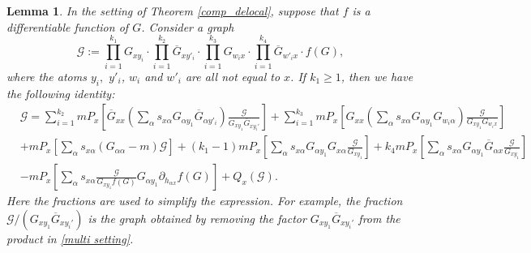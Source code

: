 \documentclass{article}
\newcommand{\1}{\mathds{1}}
\numberwithin{equation}{section}
\newcommand{\al}{\alpha}
\newcommand{\be}{\begin{equation}}
\newcommand{\ee}{\end{equation}}
\renewcommand{\cal}{\mathcal}
\renewcommand{\geq}{\geqslant}
\renewcommand{\ge}{\geq}
\theoremstyle{plain} %
\newtheorem{lemma}[theorem]{Lemma}
\theoremstyle{remark}
\newcommand{\cor}{\color{red}}
\begin{document}
\begin{lemma}%
\label{Oe14}
In the setting of Theorem \ref{comp_delocal}, suppose that $f$ is a differentiable function of $G$. Consider a graph
\be\label{multi setting}
\cal G := \prod_{i=1}^{k_1}G_{x y_i}  \cdot  \prod_{i=1}^{k_2}\overline G_{x y'_i} \cdot \prod_{i=1}^{k_3} G_{ w_i x} \cdot \prod_{i=1}^{k_4}\overline G_{ w'_i x} \cdot f(G),
\ee
where the atoms $y_i,$ $y'_i$, $w_i$ and $w'_i$ are all not equal to $x$. If $k_1\ge 1$, then we have the following identity: 
\begin{align} 
& \cal G  = \sum_{i=1}^{k_2}m P_x \left[ \overline G_{xx}  \left( \sum_\al s_{x\al }G_{\al y_1} \overline G_{\al y'_i}\right)\frac{\cal G}{G_{x y_1} \overline G_{xy_i'}} \right] + \sum_{i=1}^{k_3} m P_x \left[ G_{xx} \left(\sum_\al s_{x\al }G_{\al y_1} G_{w_i \al} \right)\frac{\cal G}{G_{xy_1}G_{w_i x}}\right] \nonumber \\
&+  m P_x \left[  \sum_\al s_{x\al }\left(G_{\al \al}-m\right) \cal G\right] +(k_1-1) m P_x \left[  \sum_\al s_{x\al }G_{\al y_1} G_{x \al} \frac{ \cal G}{G_{xy_1}}\right] + k_4 m P_x \left[  \sum_\al s_{x\al }G_{\al y_1} \overline G_{\al x} \frac{\cal G}{G_{xy_1}}\right] \nonumber\\
 & - m P_x \left[  \sum_\al s_{x\al }\frac{\cal G}{G_{x y_1}f(G)}G_{\al y_1}\partial_{ h_{\al x}}f (G)\right]+ Q_x \left(  \cal G\right)  .\label{gH0} 
 \end{align} 
Here the fractions are used to simplify the expression. For example, the fraction ${\cal G}/({G_{x y_1} \overline G_{xy_i'}})$ is the  graph obtained by removing the factor ${G_{x y_1} \overline G_{xy_i'}}$ from the product in \eqref{multi setting}.
 \end{lemma}
\end{document}
